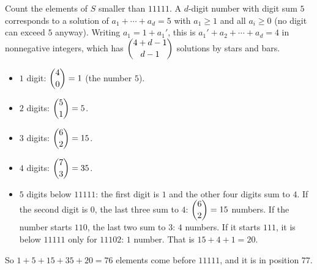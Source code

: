 Count the elements of $S$ smaller than $11111$. A $d$-digit number with digit sum $5$ corresponds to a solution of $a_1+\cdots+a_d=5$ with $a_1\ge1$ and all $a_i\ge0$ (no digit can exceed $5$ anyway). Writing $a_1=1+a_1'$, this is $a_1'+a_2+\cdots+a_d=4$ in nonnegative integers, which has $\dbinom{4+d-1}{d-1}$ solutions by stars and bars.
\begin{itemize}
\item $1$ digit: $\dbinom40=1$ (the number $5$).
\item $2$ digits: $\dbinom51=5$.
\item $3$ digits: $\dbinom62=15$.
\item $4$ digits: $\dbinom73=35$.
\item $5$ digits below $11111$: the first digit is $1$ and the other four digits sum to $4$. If the second digit is $0$, the last three sum to $4$: $\dbinom62=15$ numbers. If the number starts $110$, the last two sum to $3$: $4$ numbers. If it starts $111$, it is below $11111$ only for $11102$: $1$ number. That is $15+4+1=20$.
\end{itemize}
So $1+5+15+35+20=76$ elements come before $11111$, and it is in position $\boxed{77}$.
